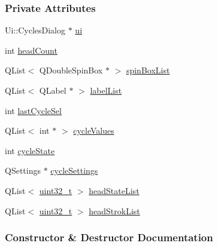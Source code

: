 \subsubsection*{Private Attributes}
\begin{DoxyCompactItemize}
\item 
Ui\+::\+Cycles\+Dialog $\ast$ \mbox{\hyperlink{classCyclesDialog_a40d0b1d840144ae10ec8269fafc77ea1}{ui}}
\item 
int \mbox{\hyperlink{classCyclesDialog_aaa0b334934a65c2bf2ef231a31199779}{head\+Count}}
\item 
Q\+List$<$ Q\+Double\+Spin\+Box $\ast$ $>$ \mbox{\hyperlink{classCyclesDialog_a322448cc7948ab1d5fce41291fbfab5a}{spin\+Box\+List}}
\item 
Q\+List$<$ Q\+Label $\ast$ $>$ \mbox{\hyperlink{classCyclesDialog_a3c6c74691e32ce18a38b8002917b6734}{label\+List}}
\item 
int \mbox{\hyperlink{classCyclesDialog_a1b608c6d6ebf52a902645ee910f91ffa}{last\+Cycle\+Sel}}
\item 
Q\+List$<$ int $\ast$ $>$ \mbox{\hyperlink{classCyclesDialog_a6c5035971ebd473201fa9c62e58fee3a}{cycle\+Values}}
\item 
int \mbox{\hyperlink{classCyclesDialog_a0296f0dc0b57b44f6d69e1a9b5cc00ad}{cycle\+State}}
\item 
Q\+Settings $\ast$ \mbox{\hyperlink{classCyclesDialog_aaf91e761bb72e2603988719a671aab3b}{cycle\+Settings}}
\item 
Q\+List$<$ \mbox{\hyperlink{settings_8h_a4196118492a3b1493c81f250e90af775}{uint32\+\_\+t}} $>$ \mbox{\hyperlink{classCyclesDialog_aa847f1b8721dff01575a9600da120a3a}{head\+State\+List}}
\item 
Q\+List$<$ \mbox{\hyperlink{settings_8h_a4196118492a3b1493c81f250e90af775}{uint32\+\_\+t}} $>$ \mbox{\hyperlink{classCyclesDialog_a1f87902a8d3b08aadc86fe1ef83ccca9}{head\+Strok\+List}}
\end{DoxyCompactItemize}


\subsubsection{Constructor \& Destructor Documentation}
\mbox{\label{classCyclesDialog_a0fa891942095d90fef41ec6aa8fa3860}} 
